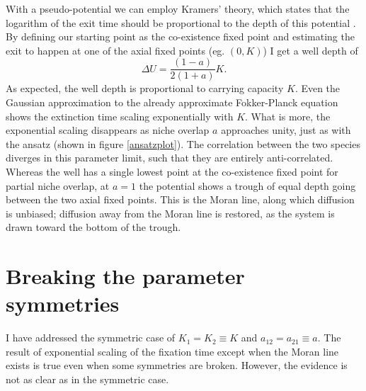 With a pseudo-potential we can employ Kramers' theory, which states that the logarithm of the exit time should be proportional to the depth of this potential \cite{Hanggi1990}. 
By defining our starting point as the co-existence fixed point and estimating the exit to happen at one of the axial fixed points (eg. $(0,K)$) I get a well depth of
\begin{equation}
\Delta U = \frac{(1-a)}{2(1+a)}K. 
\end{equation}
As expected, the well depth is proportional to carrying capacity $K$. 
Even the Gaussian approximation to the already approximate Fokker-Planck equation shows the extinction time scaling exponentially with $K$. 
What is more, the exponential scaling disappears as niche overlap $a$ approaches unity, just as with the ansatz (shown in figure \ref{ansatzplot}). 
The correlation between the two species diverges in this parameter limit, such that they are entirely anti-correlated. 
Whereas the well has a single lowest point at the co-existence fixed point for partial niche overlap, at $a=1$ the potential shows a trough of equal depth going between the two axial fixed points. 
This is the Moran line, along which diffusion is unbiased; diffusion away from the Moran line is restored, as the system is drawn toward the bottom of the trough. 



\section{Breaking the parameter symmetries}
I have addressed the symmetric case of $K_1 = K_2 \equiv K$ and $a_{12} = a_{21} \equiv a$. 
The result of exponential scaling of the fixation time except when the Moran line exists is true even when some symmetries are broken. 
However, the evidence is not as clear as in the symmetric case. 

